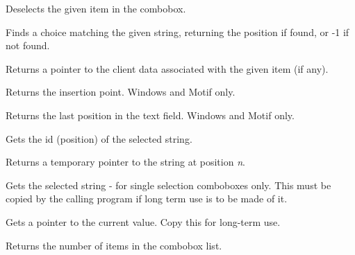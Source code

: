 
Deselects the given item in the combobox.



Finds a choice matching the given string, returning the position if found, or
-1 if not found.



Returns a pointer to the client data associated with the given item (if any).



Returns the insertion point. Windows and Motif only.



Returns the last position in the text field. Windows and Motif only.



Gets the id (position) of the selected string.



Returns a temporary pointer to the string at position {\it n}.



Gets the selected string - for single selection comboboxes only. This
must be copied by the calling program if long term use is to be made of
it.



Gets a pointer to the current value. Copy this for long-term use.



Returns the number of items in the combobox list.

